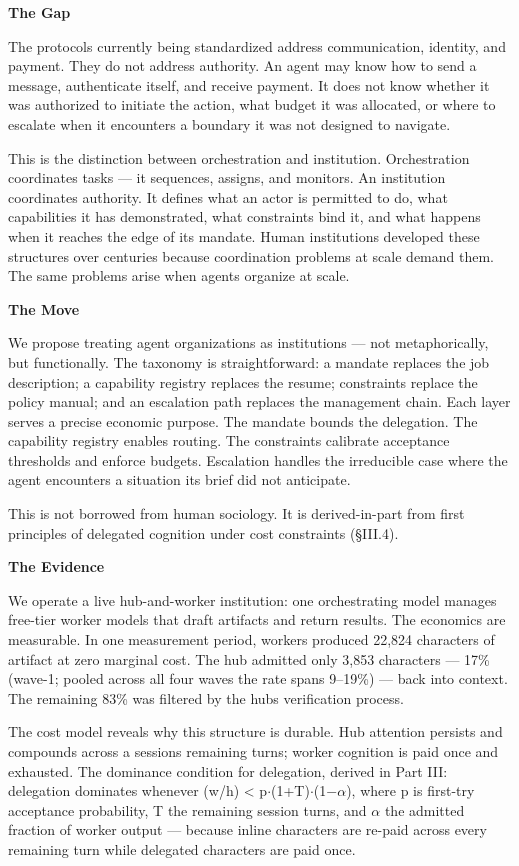 \documentclass[
]{article}
\begin{document}
\textbf{The Gap}

The protocols currently being standardized address communication,
identity, and payment. They do not address authority. An agent may know
how to send a message, authenticate itself, and receive payment. It does
not know whether it was authorized to initiate the action, what budget
it was allocated, or where to escalate when it encounters a boundary it
was not designed to navigate.

This is the distinction between orchestration and institution.
Orchestration coordinates tasks --- it sequences, assigns, and monitors.
An institution coordinates authority. It defines what an actor is
permitted to do, what capabilities it has demonstrated, what constraints
bind it, and what happens when it reaches the edge of its mandate. Human
institutions developed these structures over centuries because
coordination problems at scale demand them. The same problems arise when
agents organize at scale.

\textbf{The Move}

We propose treating agent organizations as institutions --- not
metaphorically, but functionally. The taxonomy is straightforward: a
mandate replaces the job description; a capability registry replaces the
resume; constraints replace the policy manual; and an escalation path
replaces the management chain. Each layer serves a precise economic
purpose. The mandate bounds the delegation. The capability registry
enables routing. The constraints calibrate acceptance thresholds and
enforce budgets. Escalation handles the irreducible case where the agent
encounters a situation its brief did not anticipate.

This is not borrowed from human sociology. It is derived-in-part from
first principles of delegated cognition under cost constraints (\S{}III.4).

\textbf{The Evidence}

We operate a live hub-and-worker institution: one orchestrating model
manages free-tier worker models that draft artifacts and return results.
The economics are measurable. In one measurement period, workers
produced 22,824 characters of artifact at zero marginal cost. The hub
admitted only 3,853 characters --- 17\% (wave-1; pooled across all four
waves the rate spans 9--19\%) --- back into context. The remaining 83\%
was filtered by the hub\textquotesingle s verification process.

The cost model reveals why this structure is durable. Hub attention
persists and compounds across a session\textquotesingle s remaining
turns; worker cognition is paid once and exhausted. The dominance
condition for delegation, derived in Part III: delegation dominates
whenever (w/h) \textless{} p$\cdot$(1+T)$\cdot$(1$-$$\alpha$), where p is first-try
acceptance probability, T the remaining session turns, and $\alpha$ the
admitted fraction of worker output --- because inline characters are
re-paid across every remaining turn while delegated characters are paid
once.
\end{document}
